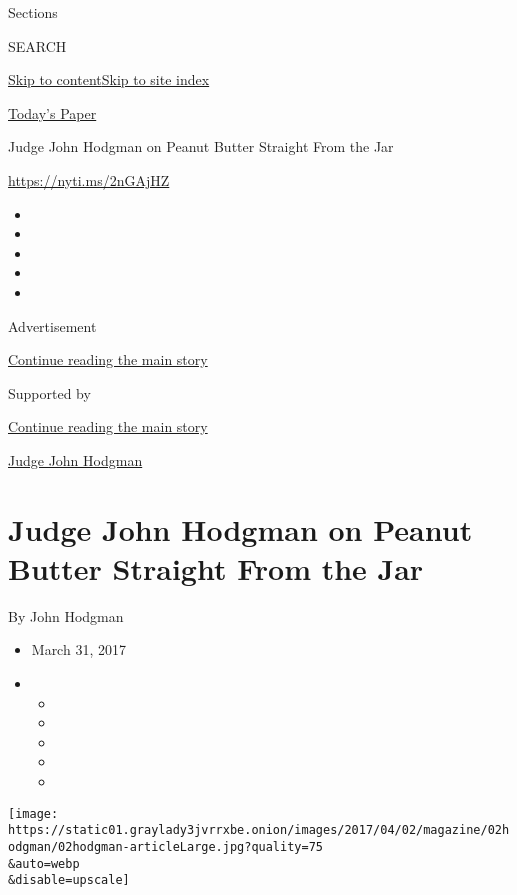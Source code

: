 Sections

SEARCH

\protect\hyperlink{site-content}{Skip to
content}\protect\hyperlink{site-index}{Skip to site index}

\href{https://myaccount.nytimes3xbfgragh.onion/auth/login?response_type=cookie\&client_id=vi}{}

\href{https://www.nytimes3xbfgragh.onion/section/todayspaper}{Today's
Paper}

Judge John Hodgman on Peanut Butter Straight From the Jar

\url{https://nyti.ms/2nGAjHZ}

\begin{itemize}
\item
\item
\item
\item
\item
\end{itemize}

Advertisement

\protect\hyperlink{after-top}{Continue reading the main story}

Supported by

\protect\hyperlink{after-sponsor}{Continue reading the main story}

\href{/column/judge-john-hodgman}{Judge John Hodgman}

\hypertarget{judge-john-hodgman-on-peanut-butter-straight-from-the-jar}{%
\section{Judge John Hodgman on Peanut Butter Straight From the
Jar}\label{judge-john-hodgman-on-peanut-butter-straight-from-the-jar}}

By John Hodgman

\begin{itemize}
\item
  March 31, 2017
\item
  \begin{itemize}
  \item
  \item
  \item
  \item
  \item
  \end{itemize}
\end{itemize}

\texttt{[image: https://static01.graylady3jvrrxbe.onion/images/2017/04/02/magazine/02hodgman/02hodgman-articleLarge.jpg?quality=75\\\&auto=webp\\\&disable=upscale]}

